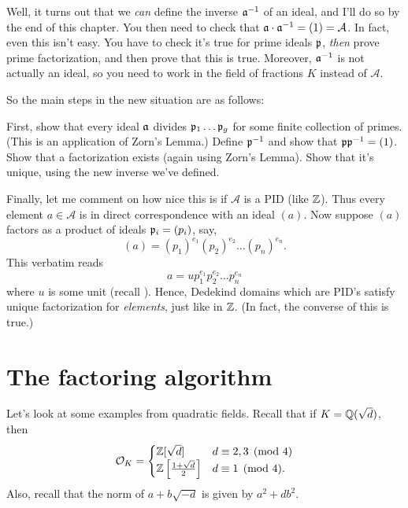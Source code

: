 Well, it turns out that we \emph{can} define the inverse $\aa\inv$ of an ideal,
and I'll do so by the end of this chapter.
You then need to check that $\aa \cdot \aa\inv = (1) = \mathcal A$.
In fact, even this isn't easy.
You have to check it's true for prime ideals $\pp$,
\emph{then} prove prime factorization,
and then prove that this is true.
Moreover, $\aa\inv$ is not actually an ideal, so you need to
work in the field of fractions $K$ instead of $\mathcal A$.

So the main steps in the new situation are as follows:
\begin{enumerate}[(1)]
	\ii First, show that every ideal $\aa$ divides $\pp_1 \dots \pp_g$
	for some finite collection of primes.
	(This is an application of Zorn's Lemma.)
	\ii Define $\pp\inv$ and show that $\pp \pp\inv = (1)$.
	\ii Show that a factorization exists (again using Zorn's Lemma).
	\ii Show that it's unique, using the new inverse we've defined.
\end{enumerate}

Finally, let me comment on how nice this is if $\mathcal A$ is a PID (like $\ZZ$).
Thus every element $a \in \mathcal A$ is in direct correspondence with an ideal $(a)$.
Now suppose $(a)$ factors as a product of ideals $\pp_i = (p_i)$, say,
\[ (a) = (p_1)^{e_1} (p_2)^{e_2} \dots (p_n)^{e_n} . \]
This verbatim reads \[ a = u p_1^{e_1} p_2^{e_2} \dots p_n^{e_n} \]
where $u$ is some unit (recall ).
Hence, Dedekind domains which are PID's satisfy unique factorization for \emph{elements},
just like in $\ZZ$. (In fact, the converse of this is true.)

\section{The factoring algorithm}
Let's look at some examples from quadratic fields.
Recall that if $K = \QQ(\sqrt{d})$, then
\[
	\OO_K =
	\begin{cases}
		\ZZ[\sqrt d] & d \equiv 2,3 \pmod 4 \\
		\ZZ\left[ \frac{1+\sqrt d}{2} \right] & d \equiv 1 \pmod 4.
	\end{cases}
\]
Also, recall that the norm of $a+b\sqrt{-d}$ is given by $a^2+db^2$.


